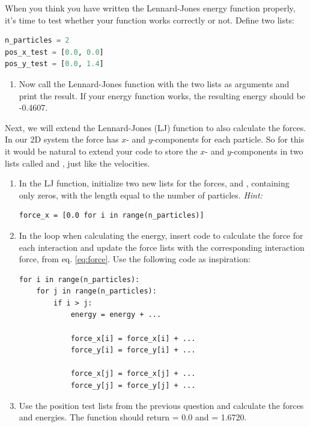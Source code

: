 \documentclass{article}
\begin{document}
When you think you have written the Lennard-Jones energy function properly,
it's time to test whether your function works correctly or not.
Define two lists:

\begin{lstlisting}[language=python]
n_particles = 2
pos_x_test = [0.0, 0.0]
pos_y_test = [0.0, 1.4]
\end{lstlisting}

\begin{enumerate}[resume]

    \item Now call the Lennard-Jones function with the two lists as arguments and print the result.
        If your energy function works, the resulting energy should be -0.4607.

\end{enumerate}

Next, we will extend the Lennard-Jones (LJ) function to also calculate the forces.
In our 2D system the force has $x$- and $y$-components for each particle.
So for this it would be natural to extend your code to store the $x$- and $y$-components in two lists called  and , just like the velocities.

\begin{enumerate}[resume]

    \item In the LJ function, initialize two new lists for the forces,  and , containing only zeros, with the length equal to the number of particles.
    {\em Hint:}

\begin{lstlisting}
force_x = [0.0 for i in range(n_particles)]
\end{lstlisting}

    \item In the loop when calculating the energy, insert code to calculate the force for each interaction and update the force lists with the corresponding interaction force, from eq. \ref{eq:force}.
        Use the following code as inspiration:

\begin{lstlisting}
for i in range(n_particles):
    for j in range(n_particles):
        if i > j:
            energy = energy + ...

            force_x[i] = force_x[i] + ...
            force_y[i] = force_y[i] + ...

            force_x[j] = force_x[j] + ...
            force_y[j] = force_y[j] + ...
\end{lstlisting}

    \item Use the position test lists from the previous question and calculate the forces and energies.
        The function should return  = 0.0 and  = 1.6720.

\end{enumerate}
\end{document}
